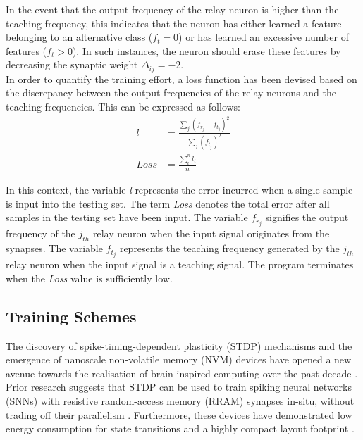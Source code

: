 \noindent In the event that the output frequency of the relay neuron is higher than the teaching frequency, this indicates that the neuron has either learned a feature belonging to an alternative class ($f_t = 0$) or has learned an excessive number of features ($f_t > 0$). In such instances, the neuron should erase these features by decreasing the synaptic weight $\Delta_{ij} = -2$.\\

\noindent In order to quantify the training effort, a loss function has been devised based on the discrepancy between the output frequencies of the relay neurons and the teaching frequencies. This can be expressed as follows:
\begin{align}
l &= \frac{\sum_{j}^{}\left( f_{r_j} - f_{t_j} \right)^2}{\sum_{j}^{}\left( f_{t_j} \right)^2} \label{eq:6.13}\\
Loss &= \frac{\sum_{i}^{n}l_i}{n} \label{eq:6.14}
\end{align}

\noindent In this context, the variable \textit{l} represents the error incurred when a single sample is input into the testing set. The term \textit{Loss} denotes the total error after all samples in the testing set have been input. The variable $f_{r_j}$ signifies the output frequency of the $j_{th}$ relay neuron when the input signal originates from the synapses. The variable $f_{t_j}$ represents the teaching frequency generated by the $j_{th}$ relay neuron when the input signal is a teaching signal. The program terminates when the \textit{Loss} value is sufficiently low.

\subsection[Training Schemes]{Training Schemes}

The discovery of spike-timing-dependent plasticity (STDP) mechanisms and the emergence of nanoscale non-volatile memory (NVM) devices have opened a new avenue towards the realisation of brain-inspired computing over the past decade \cite{zamarreno2011spike}. Prior research suggests that STDP can be used to train spiking neural networks (SNNs) with resistive random-access memory (RRAM) synapses in-situ, without trading off their parallelism \cite{querlioz2012bioinspired}. Furthermore, these devices have demonstrated low energy consumption for state transitions and a highly compact layout footprint \cite{yu2011electronic}.\\


